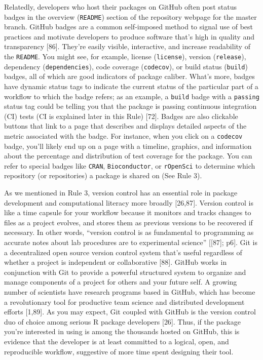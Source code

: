 \documentclass[10pt,letterpaper]{article}
\begin{document}
Relatedly, developers who host their packages on GitHub often post
status badges in the overview (\texttt{README}) section of the
repository webpage for the master branch. GitHub badges are a common
self-imposed method to signal use of best practices and motivate
developers to produce software that's high in quality and transparency
{[}86{]}. They're easily visible, interactive, and increase readability
of the \texttt{README}. You might see, for example, license
(\texttt{license}), version (\texttt{release}), dependency
(\texttt{dependencies}), code coverage (\texttt{codecov}), or build
status (\texttt{build}) badges, all of which are good indicators of
package caliber. What's more, badges have dynamic status tags to
indicate the current status of the particular part of a workflow to
which the badge refers; as an example, a \texttt{build} badge with a
\texttt{passing} status tag could be telling you that the package is
passing continuous integration (CI) tests (CI is explained later in this
Rule) {[}72{]}. Badges are also clickable buttons that link to a page
that describes and displays detailed aspects of the metric associated
with the badge. For instance, when you click on a \texttt{codecov}
badge, you'll likely end up on a page with a timeline, graphics, and
information about the percentage and distribution of test coverage for
the package. You can refer to special badges like \texttt{CRAN},
\texttt{Bioconductor}, or \texttt{rOpenSci} to determine which
repository (or repositories) a package is shared on (See Rule 3).

As we mentioned in Rule 3, version control has an essential role in
package development and computational literacy more broadly {[}26,87{]}.
Version control is like a time capsule for your workflow because it
monitors and tracks changes to files as a project evolves, and stores
them as previous versions to be recovered if necessary. In other words,
``version control is as fundamental to programming as accurate notes
about lab procedures are to experimental science'' {[}{[}87{]}; p6{]}.
Git is a decentralized open source version control system that's useful
regardless of whether a project is independent or collaborative
{[}88{]}. GitHub works in conjunction with Git to provide a powerful
structured system to organize and manage components of a project for
others and your future self. A growing number of scientists have
research programs based in GitHub, which has become a revolutionary tool
for productive team science and distributed development efforts
{[}1,89{]}. As you may expect, Git coupled with GitHub is the version
control duo of choice among serious R package developers {[}26{]}. Thus,
if the package you're interested in using is among the thousands hosted
on GitHub, this is evidence that the developer is at least committed to
a logical, open, and reproducible workflow, suggestive of more time
spent designing their tool.
\end{document}
